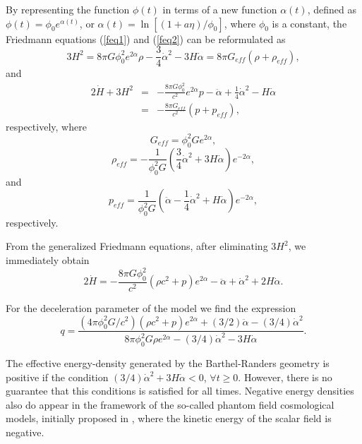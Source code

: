 \documentclass[aps,superscriptaddress, showpacs,preprintnumbers, superscriptaddress, nofootinbibt,twocolumn]{revtex4-2}
\def\be{\begin{equation}}
\def\ee{\end{equation}}
\def\bea{\begin{eqnarray}}
\def\eea{\end{eqnarray}}
\begin{document}
By representing the function $\phi (t)$ in terms of a new function $\alpha (t)$, defined as $\phi (t)=\phi _0e^{\alpha (t)}$, or $\alpha (t)=\ln \left[(1+a\eta)/\phi _0\right]$, where $\phi _0$ is a constant, the Friedmann equations (\ref{feq1}) and (\ref{feq2}) can be reformulated as
\be
3H^2=8\pi G \phi_0^2e^{2\alpha}\rho -\frac{3}{4}\dot{\alpha}^2-3H\dot{\alpha}=8\pi G_{eff}\left(\rho+\rho_{eff}\right),
\ee
and
\bea
2\dot{H}+3H^2&=&-\frac{8\pi G \phi_0^2}{c^2}e^{2\alpha}p-\ddot{\alpha}+\frac{1}{4}\dot{\alpha}^2-H\dot{\alpha}\nonumber\\
&=&-\frac{8\pi G_{eff}}{c^2}\left(p+p_{eff}\right),
\eea
respectively, where
\be
G_{eff}=\phi _0^2Ge^{2\alpha},
\ee
\be
\rho_{eff}=-\frac{1}{\phi _0^2G}\left(\frac{3}{4}\dot{\alpha}^2+3H\dot{\alpha}\right)e^{-2\alpha},
\ee
and
\be
p_{eff}=\frac{1}{\phi _0^2G}\left(\ddot{\alpha}-\frac{1}{4}\dot{\alpha}^2+H\dot{\alpha} \right)e^{-2\alpha},
\ee
respectively.

From the generalized Friedmann equations, after eliminating $3H^2$, we immediately obtain
\be
2\dot{H}=-\frac{8\pi G\phi _0^2}{c^2}\left(\rho c^2+p\right)e^{2\alpha}-\ddot{\alpha}+\dot{\alpha}^2+2H\dot{\alpha}.
\ee

For the deceleration parameter of the model we find the expression
\begin{equation}
q=\frac{\left( 4\pi \phi _{0}^{2}G/c^{2}\right) \left( \rho c^{2}+p\right)
e^{2\alpha }+(3/2)\ddot{\alpha}-(3/4)\dot{\alpha}^{2}}{8\pi \phi
_{0}^{2}G\rho e^{2\alpha }-(3/4)\dot{\alpha}^{2}-3H\dot{\alpha}}.
\end{equation}

The effective energy-density generated by the Barthel-Randers geometry is positive if the condition $(3/4)\dot{\alpha}^2+3H\dot{\alpha}<0$, $\forall t\geq 0$. However, there is no guarantee that this conditions is satisfied for all times. Negative energy densities also do appear in the framework of the so-called phantom field cosmological models, initially proposed in \cite{Ph}, where the kinetic energy of the scalar field is negative.
\end{document}
